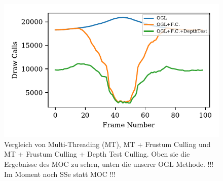 \documentclass[journal]{vgtc}
\begin{document}
\begin{figure}
	\begin{minipage}{0.4\textwidth}
		\includegraphics[width=1\textwidth]{images/Evaluation_7_Results_OGL_Draw Calls.pdf}
	\end{minipage}
	\begin{minipage}{0.4\textwidth}
		\centering
	\end{minipage}
	\caption{Vergleich von Multi-Threading (MT), MT + Frustum Culling und MT + Frustum Culling + Depth Test Culling. Oben sie die Ergebnisse des MOC zu sehen, unten die unserer OGL Methode. !!! Im Moment noch SSe statt MOC !!!}
	\label{fig:OGL_MOC_frustum_culling}
\end{figure}
\end{document}
